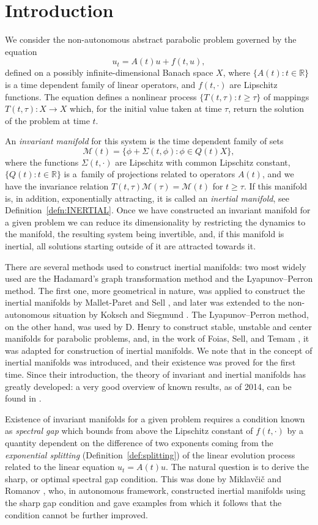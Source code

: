 \documentclass[a4paper,11pt,reqno]{amsart}
\theoremstyle{plain}
\theoremstyle{definition}
\numberwithin{equation}{section}
\newcommand{\R}{\mathbb{R}}
\newcommand{\calm}{\mathcal M}
\renewcommand{\geq}{\geqslant}
\begin{document}
\section{Introduction}
We consider the non-autonomous abstract parabolic problem governed by the equation
$$
u_t=A(t)u+f(t,u),
$$
defined on a possibly infinite-dimensional Banach space $X$, where $\{A(t)\colon t\in \R\}$ is a time dependent family of linear operators, and $f(t,\cdot)$ are Lipschitz functions. The equation defines a nonlinear process $\{T(t,\tau)\colon t\geq \tau\}$ of mappings $T(t,\tau)\colon X\to X$ which, for the initial value taken at time $\tau$, return the solution of the problem at time $t$. 

An \textit{invariant manifold} for this system is the time dependent family of sets 
$$
\calm(t) = \{ \phi + \Sigma(t,\phi)\colon \phi\in Q(t)X\},
$$
where the functions $\Sigma(t,\cdot)$ are Lipschitz with common Lipschitz constant, $\{Q(t)\colon t\in\R\}$ is a~family of projections related to operators $A(t)$, and we have the invariance relation $T(t,\tau)\calm(\tau)=\calm(t)$ for $t\geq \tau$. If this manifold is, in addition, exponentially attracting, it is called an \textit{inertial manifold}, see Definition~\ref{defn:INERTIAL}. 
Once we have constructed an invariant manifold for a given problem we can reduce its dimensionality  by restricting the dynamics to  the manifold, the resulting system being invertible, and, if this manifold is inertial, all solutions starting outside of it are attracted towards it. 

There are several methods used to construct inertial manifolds: two most widely used are the Hadamard's graph transformation method  and the Lyapunov--Perron method. The first one, more geometrical in nature, was applied to construct the inertial manifolds by Mallet-Paret and Sell \cite{MPS}, and later was extended to the non-autonomous situation by Koksch and Siegmund \cite{KS02}. The Lyapunov--Perron method, on the other hand, was used by D. Henry \cite{Henry} to construct stable, unstable and center manifolds for parabolic problems, and, in the work of Foias, Sell, and Temam \cite{FST}, it was adapted for construction of inertial manifolds. We note that in \cite{FST} the concept of inertial manifolds was introduced, and their existence was proved for the first time. Since their introduction, the theory of invariant and inertial manifolds has greatly developed: a very good overview of known results, as of 2014, can be found in \cite{Zelik}. 

Existence of invariant manifolds for a given problem requires a condition known as \textit{spectral gap} which bounds from above the Lipschitz constant of $f(t,\cdot)$ by a quantity dependent on the difference of two exponents coming from the \textit{exponential splitting} (Definition~\ref{def:splitting}) of the linear evolution process related to the linear equation $u_t=A(t)u$. The natural question is to derive the sharp, or optimal spectral gap condition. This was done by Miklav\v{c}i\v{c} \cite{Miklavcic} and Romanov \cite{Romanov}, who, in autonomous framework, constructed inertial manifolds using the sharp gap condition and gave examples from which it follows that the condition cannot be further improved. 
\end{document}
